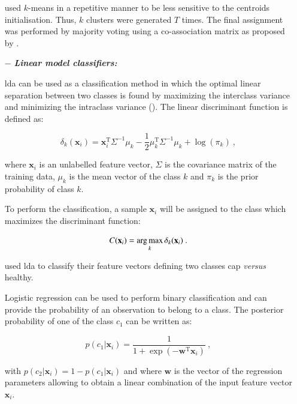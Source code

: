 \begin{enumerate}[leftmargin=*]
\cite{Tiwari2008,Viswanath2008,Viswanath2008a} used $k$-means in a repetitive manner to be less sensitive to the centroids initialisation. Thus, $k$ clusters were generated $T$ times. The final assignment was performed by majority voting using a co-association matrix as proposed by \cite{Fred2005}.

\item[$-$] \textbf{\textit{Linear model classifiers:}} 

\Acf{lda} can be used as a classification method in which the optimal linear separation between two classes is found by maximizing the interclass variance and minimizing the intraclass variance (\cite{Friedman1989}). The linear discriminant function is defined as:

\begin{equation}
	\delta_{k}(\mathbf{x}_i) = \mathbf{x}_i^{\text{T}} \Sigma^{-1} \mu_k - \frac{1}{2} \mu_{k}^{\text{T}} \Sigma^{-1} \mu_k + \log (\pi_k) \ ,
	\label{eq:ldafun}
\end{equation}

\noindent where $\mathbf{x}_i$ is an unlabelled feature vector, $\Sigma$ is the covariance matrix of the training data, $\mu_k$ is the mean vector of the class $k$ and $\pi_k$ is the prior probability of class $k$.

To perform the classification, a sample $\mathbf{x}_i$ will be assigned to the class which maximizes the discriminant function:

\begin{equation}
	C(\mathbf{x}_i) = \operatorname*{arg\,max}_k \delta_k(\mathbf{x}_i) \ .
	\label{eq:ldaclass}
\end{equation}

\cite{Antic2013,Chan2003,Niaf2011,Niaf2012,Vos2012} used \ac{lda} to classify their feature vectors defining two classes \ac{cap} \textit{versus} healthy.

Logistic regression can be used to perform binary classification and can provide the probability of an observation to belong to a class. The posterior probability of one of the class $c_1$ can be written as:

\begin{equation}
	p(c_1|\mathbf{x}_i) = \frac{1}{1+\exp(-\mathbf{w}^{\text{T}}\mathbf{x}_i)} \ ,
	\label{eq:postprlr}
\end{equation}

\noindent with $p(c_2|\mathbf{x}_i) = 1 - p(c_1|\mathbf{x}_i)$ and where $\mathbf{w}$ is the vector of the regression parameters allowing to obtain a linear combination of the input feature vector $\mathbf{x}_i$.


\end{enumerate}
